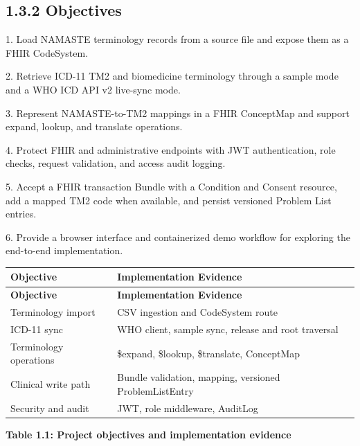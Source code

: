 \documentclass[12pt,a4paper,oneside]{report}
\begin{document}
\subsection*{1.3.2 Objectives}
1. Load NAMASTE terminology records from a source file and expose them as a FHIR CodeSystem.

2. Retrieve ICD-11 TM2 and biomedicine terminology through a sample mode and a WHO ICD API v2 live-sync mode.

3. Represent NAMASTE-to-TM2 mappings in a FHIR ConceptMap and support expand, lookup, and translate operations.

4. Protect FHIR and administrative endpoints with JWT authentication, role checks, request validation, and access audit logging.

5. Accept a FHIR transaction Bundle with a Condition and Consent resource, add a mapped TM2 code when available, and persist versioned Problem List entries.

6. Provide a browser interface and containerized demo workflow for exploring the end-to-end implementation.

\begin{longtable}{|p{}|p{}|}
\hline
\textbf{Objective} & \textbf{Implementation Evidence} \\ \hline
\endfirsthead
\hline \textbf{Objective} & \textbf{Implementation Evidence} \\ \hline\endhead
Terminology import & CSV ingestion and CodeSystem route \\ \hline
ICD-11 sync & WHO client, sample sync, release and root traversal \\ \hline
Terminology operations & \$expand, \$lookup, \$translate, ConceptMap \\ \hline
Clinical write path & Bundle validation, mapping, versioned ProblemListEntry \\ \hline
Security and audit & JWT, role middleware, AuditLog \\ \hline
\end{longtable}
\vspace{4pt}
\smallskip\textbf{\textbf{Table 1.1: Project objectives and implementation evidence}}\
\end{document}
